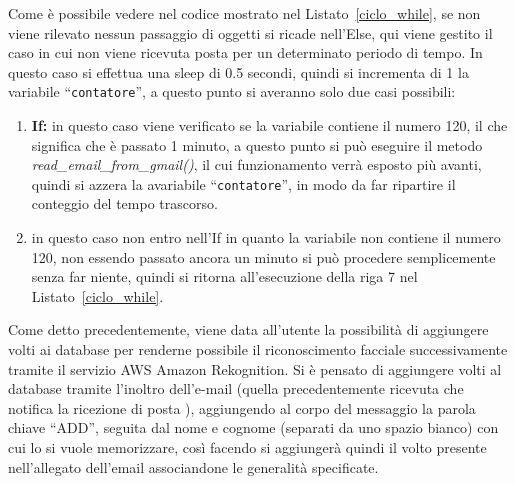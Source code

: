 Come è possibile vedere nel codice mostrato nel Listato~\ref{ciclo_while}, se non viene rilevato nessun passaggio di oggetti si ricade nell'Else, qui viene gestito il
caso in cui non viene ricevuta posta per un determinato periodo di tempo.
In questo caso si effettua una sleep di 0.5 secondi, quindi si incrementa di 1 la variabile ``\texttt{contatore}'', a questo punto si averanno solo due casi possibili:
\begin{enumerate}
    \item \textbf{If:} in questo caso viene verificato se la variabile contiene il numero 120, il che significa che è passato 1 minuto, a questo punto si può eseguire il metodo
    \textit{read\_email\_from\_gmail()}, il cui funzionamento verrà esposto più avanti, quindi si azzera la avariabile ``\texttt{contatore}'', in modo da far ripartire
    il conteggio del tempo trascorso.
    \item in questo caso non entro nell'If in quanto la variabile non contiene il numero 120, non essendo  passato ancora un minuto si può procedere semplicemente senza
    far niente, quindi si ritorna all'esecuzione della riga 7 nel Listato~\ref{ciclo_while}.
\end{enumerate}
Come detto precedentemente, viene data all'utente la possibilità di aggiungere volti ai database per renderne possibile il riconoscimento facciale successivamente 
tramite il servizio AWS Amazon Rekognition. Si è pensato di aggiungere volti al database tramite l'inoltro dell'e-mail (quella precedentemente ricevuta che notifica 
la ricezione di posta ), aggiungendo al corpo del messaggio la parola chiave ``ADD'', seguita dal nome e cognome (separati da uno spazio bianco) con cui lo si vuole memorizzare, così facendo si 
aggiungerà quindi il volto presente nell'allegato dell'email associandone le generalità specificate.

